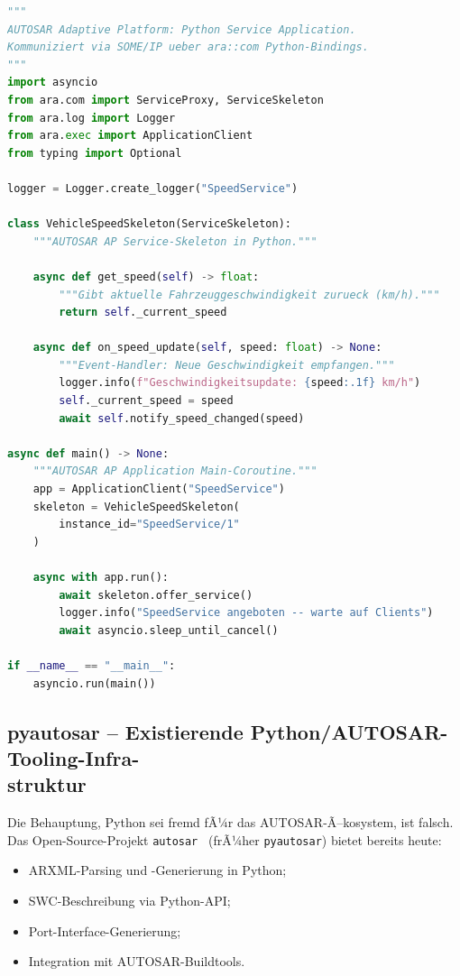 ﻿\documentclass[12pt,a4paper,twoside]{article}
\begin{document}
\begin{lstlisting}[language=Python,caption={Python Adaptive Application (ara-Bindings)},label=lst:pyara]
"""
AUTOSAR Adaptive Platform: Python Service Application.
Kommuniziert via SOME/IP ueber ara::com Python-Bindings.
"""
import asyncio
from ara.com import ServiceProxy, ServiceSkeleton
from ara.log import Logger
from ara.exec import ApplicationClient
from typing import Optional

logger = Logger.create_logger("SpeedService")

class VehicleSpeedSkeleton(ServiceSkeleton):
    """AUTOSAR AP Service-Skeleton in Python."""
    
    async def get_speed(self) -> float:
        """Gibt aktuelle Fahrzeuggeschwindigkeit zurueck (km/h)."""
        return self._current_speed
    
    async def on_speed_update(self, speed: float) -> None:
        """Event-Handler: Neue Geschwindigkeit empfangen."""
        logger.info(f"Geschwindigkeitsupdate: {speed:.1f} km/h")
        self._current_speed = speed
        await self.notify_speed_changed(speed)

async def main() -> None:
    """AUTOSAR AP Application Main-Coroutine."""
    app = ApplicationClient("SpeedService")
    skeleton = VehicleSpeedSkeleton(
        instance_id="SpeedService/1"
    )
    
    async with app.run():
        await skeleton.offer_service()
        logger.info("SpeedService angeboten -- warte auf Clients")
        await asyncio.sleep_until_cancel()

if __name__ == "__main__":
    asyncio.run(main())
\end{lstlisting}

\subsection{pyautosar -- Existierende Python/AUTOSAR-Tooling-Infra-\\struktur}
\label{subsec:pyautosar}

Die Behauptung, Python sei fremd fÃ¼r das AUTOSAR-Ã–kosystem, ist falsch.
Das Open-Source-Projekt \texttt{autosar}~\cite{pyautosar_gh} (frÃ¼her \texttt{pyautosar})
bietet bereits heute:

\begin{itemize}
  \item ARXML-Parsing und -Generierung in Python;
  \item SWC-Beschreibung via Python-API;
  \item Port-Interface-Generierung;
  \item Integration mit AUTOSAR-Buildtools.
\end{itemize}
\end{document}
